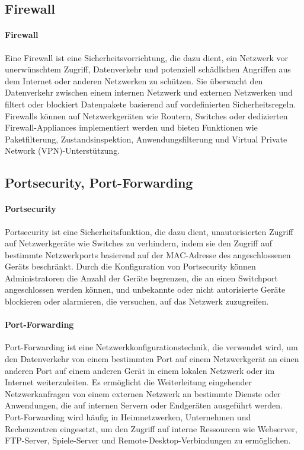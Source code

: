 \subsection{Firewall}

\paragraph{Firewall}

Eine Firewall ist eine Sicherheitsvorrichtung, die dazu dient, ein Netzwerk vor unerwünschtem Zugriff, Datenverkehr und potenziell schädlichen Angriffen aus dem Internet oder anderen Netzwerken zu schützen. Sie überwacht den Datenverkehr zwischen einem internen Netzwerk und externen Netzwerken und filtert oder blockiert Datenpakete basierend auf vordefinierten Sicherheitsregeln. Firewalls können auf Netzwerkgeräten wie Routern, Switches oder dedizierten Firewall-Appliances implementiert werden und bieten Funktionen wie Paketfilterung, Zustandsinspektion, Anwendungsfilterung und Virtual Private Network (VPN)-Unterstützung.

\subsection{Portsecurity, Port-Forwarding}

\paragraph{Portsecurity}

Portsecurity ist eine Sicherheitsfunktion, die dazu dient, unautorisierten Zugriff auf Netzwerkgeräte wie Switches zu verhindern, indem sie den Zugriff auf bestimmte Netzwerkports basierend auf der MAC-Adresse des angeschlossenen Geräts beschränkt. Durch die Konfiguration von Portsecurity können Administratoren die Anzahl der Geräte begrenzen, die an einen Switchport angeschlossen werden können, und unbekannte oder nicht autorisierte Geräte blockieren oder alarmieren, die versuchen, auf das Netzwerk zuzugreifen.

\paragraph{Port-Forwarding}

Port-Forwarding ist eine Netzwerkkonfigurationstechnik, die verwendet wird, um den Datenverkehr von einem bestimmten Port auf einem Netzwerkgerät an einen anderen Port auf einem anderen Gerät in einem lokalen Netzwerk oder im Internet weiterzuleiten. Es ermöglicht die Weiterleitung eingehender Netzwerkanfragen von einem externen Netzwerk an bestimmte Dienste oder Anwendungen, die auf internen Servern oder Endgeräten ausgeführt werden. Port-Forwarding wird häufig in Heimnetzwerken, Unternehmen und Rechenzentren eingesetzt, um den Zugriff auf interne Ressourcen wie Webserver, FTP-Server, Spiele-Server und Remote-Desktop-Verbindungen zu ermöglichen.

\clearpage